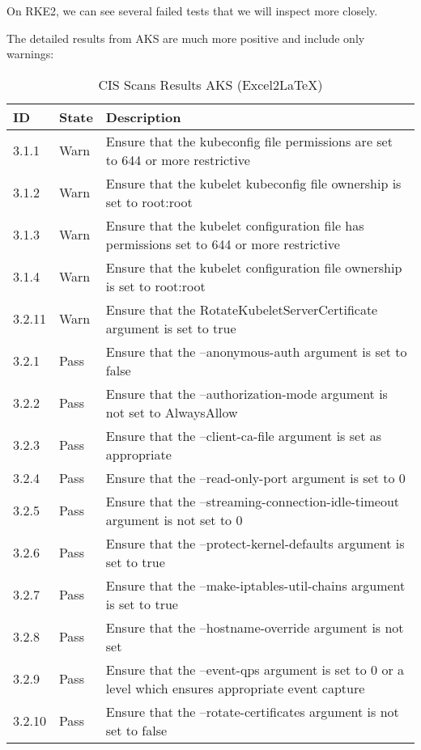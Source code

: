 On RKE2, we can see several failed tests that we will inspect more closely.

The detailed results from AKS are much more positive and include only warnings:
\pagebreak

\begin{table}[hp]
  \centering
  \caption{CIS Scans Results AKS (Excel2LaTeX)}
    \begin{tabular}{| l | l | p{11.6cm} |}
    \hline
    ID & State & Description \\
    \hline\hline
    3.1.1 & Warn  & Ensure that the kubeconfig file permissions are set to 644 or more restrictive \\
    \hline
    3.1.2 & Warn  & Ensure that the kubelet kubeconfig file ownership is set to root:root \\
    \hline
    3.1.3 & Warn  & Ensure that the kubelet configuration file has permissions set to 644 or more restrictive \\
    \hline
    3.1.4 & Warn  & Ensure that the kubelet configuration file ownership is set to root:root \\
    \hline
    3.2.11 & Warn  & Ensure that the RotateKubeletServerCertificate argument is set to true \\
    \hline
    3.2.1 & Pass  & Ensure that the --anonymous-auth argument is set to false \\
    \hline
    3.2.2 & Pass  & Ensure that the --authorization-mode argument is not set to AlwaysAllow \\
    \hline
    3.2.3 & Pass  & Ensure that the --client-ca-file argument is set as appropriate \\
    \hline
    3.2.4 & Pass  & Ensure that the --read-only-port argument is set to 0 \\
    \hline
    3.2.5 & Pass  & Ensure that the --streaming-connection-idle-timeout argument is not set to 0 \\
    \hline
    3.2.6 & Pass  & Ensure that the --protect-kernel-defaults argument is set to true \\
    \hline
    3.2.7 & Pass  & Ensure that the --make-iptables-util-chains argument is set to true \\
    \hline
    3.2.8 & Pass  & Ensure that the --hostname-override argument is not set \\
    \hline
    3.2.9 & Pass  & Ensure that the --event-qps argument is set to 0 or a level which ensures appropriate event capture \\
    \hline
    3.2.10 & Pass  & Ensure that the --rotate-certificates argument is not set to false \\
    \hline
    \end{tabular}%
  \label{tab:aksScan}%
\end{table}%

